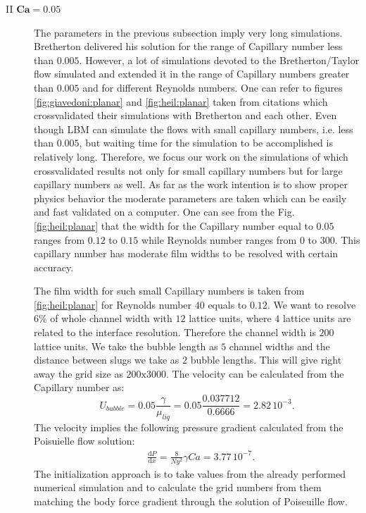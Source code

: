 \documentclass{article}
\begin{document}
\begin{description}
 \item[II $\bm{Ca=0.05}$] 
   The parameters in the previous subsection imply very long
simulations. Bretherton delivered his solution for the range of Capillary number
less than
  $0.005$. However, a lot of simulations devoted to the Bretherton/Taylor
flow
  simulated and extended it in the range of Capillary numbers greater than
$0.005$
  and for different Reynolds numbers. One can refer to figures
  \ref{fig:giavedoni:planar} and \ref{fig:heil:planar} taken from citations
  \cite{giavedoni-numerical,heil-bretherton} which crossvalidated their
  simulations with Bretherton and each other. Even though LBM can simulate the
flows with small capillary numbers, i.e. less than $0.005$, but waiting time
for the simulation to be accomplished is relatively long. Therefore, we focus
our work on the simulations of \citet{giavedoni-numerical} which crossvalidated
results not only for small capillary numbers but for large capillary numbers as
well. As far as the work intention is
  to show proper physics behavior the moderate parameters are
taken which
  can be easily and fast validated on a computer. 
  One can see from the Fig. \ref{fig:heil:planar} that the width for the
  Capillary number equal to $0.05$ ranges from $0.12$ to $0.15$ while Reynolds
  number ranges from $0$ to $300$. This capillary number has moderate film
widths
  to be resolved with certain accuracy. 

  The film width for such small Capillary numbers is taken from
  \ref{fig:heil:planar} for Reynolds number $40$ equals to $0.12$. We want to
  resolve $6\%$ of whole channel width with $12$ lattice units, where $4$
lattice units are related to the interface resolution.  Therefore the channel
  width is $200$ lattice units. We take the bubble length as $5$ channel widths
  and the distance between slugs we take as $2$ bubble lengths. This will give
  right away the grid size as $200\mathrm{x}3000$. The velocity can be
calculated from the Capillary number as:
  \begin{equation}
  U_{bubble}=0.05 \frac{\gamma}{\mu_{liq}}=0.05 \frac{0.037712}{0.6666}=2.82\,
  10^{-3}.
  \end{equation}
  The velocity implies the following pressure gradient calculated from the
  Poisuielle flow solution:
  \begin{equation}
  \begin{aligned}
  &\frac{\mathrm{d}P}{\mathrm{d}x}=\frac{8}{Ny^2}\gamma Ca=3.77\,10^{-7}.
  \end{aligned}
  \end{equation}
  The initialization approach is to take values from the already performed
numerical simulation and to calculate the grid numbers from them matching the
body force gradient through the solution of Poiseuille flow.   

\end{description}
\end{document}

